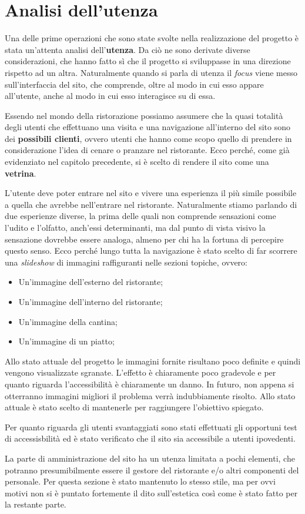 \section{Analisi dell'utenza}

Una delle prime operazioni che sono state svolte nella realizzazione del progetto è stata un'attenta analisi dell'\textbf{utenza}. Da ciò ne sono derivate diverse considerazioni, che hanno fatto sì che il progetto si sviluppasse in una direzione rispetto ad un altra. Naturalmente quando si parla di utenza il \textit{focus} viene messo sull'interfaccia del sito, che comprende, oltre al modo in cui esso appare all'utente, anche al modo in cui esso interagisce su di essa. 

Essendo nel mondo della ristorazione possiamo assumere che la quasi totalità degli utenti che effettuano una visita e una navigazione all'interno del sito sono dei \textbf{possibili clienti}, ovvero utenti che hanno come scopo quello di prendere in considerazione l'idea di cenare o pranzare nel ristorante. Ecco perché, come già evidenziato nel capitolo precedente, si è scelto di rendere il sito come una \textbf{vetrina}. 

L'utente deve poter entrare nel sito e vivere una esperienza il più simile possibile a quella che avrebbe nell'entrare nel ristorante. Naturalmente stiamo parlando di due esperienze diverse, la prima delle quali non comprende sensazioni come l'udito e l'olfatto, anch'essi determinanti, ma dal punto di vista visivo la sensazione dovrebbe essere analoga, almeno per chi ha la fortuna di percepire questo senso. Ecco perché lungo tutta la navigazione è stato scelto di far scorrere una \textit{slideshow} di immagini raffiguranti nelle sezioni topiche, ovvero:

\begin{itemize}

	\item Un'immagine dell'esterno del ristorante;
	\item Un'immagine dell'interno del ristorante;
	\item Un'immagine della cantina;
	\item Un'immagine di un piatto;

\end{itemize}

Allo stato attuale del progetto le immagini fornite risultano poco definite e quindi vengono visualizzate sgranate. L'effetto è chiaramente poco gradevole e per quanto riguarda l'accessibilità è chiaramente un danno. In futuro, non appena si otterranno immagini migliori il problema verrà indubbiamente risolto. Allo stato attuale è stato scelto di mantenerle per raggiungere l'obiettivo spiegato.

Per quanto riguarda gli utenti svantaggiati sono stati effettuati gli opportuni test di accessisbilità ed è stato verificato che il sito sia accessibile a utenti ipovedenti.

La parte di amministrazione del sito ha un utenza limitata a pochi elementi, che potranno presumibilmente essere il gestore del ristorante e/o altri componenti del personale. Per questa sezione è stato mantenuto lo stesso stile, ma per ovvi motivi non si è puntato fortemente il dito sull'estetica così come è stato fatto per la restante parte.
